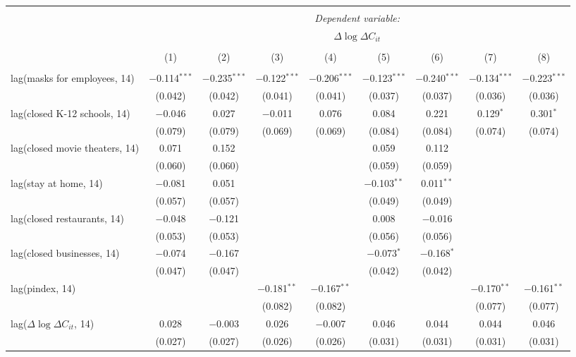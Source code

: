 \begin{tabular}{@{\extracolsep{1pt}}lcccccccc} 
\\[-1.8ex]\hline 
\hline \\[-1.8ex] 
 & \multicolumn{8}{c}{\textit{Dependent variable:}} \\ 
\cline{2-9} 
 & \multicolumn{8}{c}{$\Delta \log \Delta C_{it}$} \\ 
\\[-1.8ex] & (1) & (2) & (3) & (4) & (5) & (6) & (7) & (8)\\ 
\hline \\[-1.8ex] 
 lag(masks for employees, 14) & $-$0.114$^{***}$ & $-$0.235$^{***}$ & $-$0.122$^{***}$ & $-$0.206$^{***}$ & $-$0.123$^{***}$ & $-$0.240$^{***}$ & $-$0.134$^{***}$ & $-$0.223$^{***}$ \\ 
  & (0.042) & (0.042) & (0.041) & (0.041) & (0.037) & (0.037) & (0.036) & (0.036) \\ 
  lag(closed K-12 schools, 14) & $-$0.046 & 0.027 & $-$0.011 & 0.076 & 0.084 & 0.221 & 0.129$^{*}$ & 0.301$^{*}$ \\ 
  & (0.079) & (0.079) & (0.069) & (0.069) & (0.084) & (0.084) & (0.074) & (0.074) \\ 
  lag(closed movie theaters, 14) & 0.071 & 0.152 &  &  & 0.059 & 0.112 &  &  \\ 
  & (0.060) & (0.060) &  &  & (0.059) & (0.059) &  &  \\ 
  lag(stay at home, 14) & $-$0.081 & 0.051 &  &  & $-$0.103$^{**}$ & 0.011$^{**}$ &  &  \\ 
  & (0.057) & (0.057) &  &  & (0.049) & (0.049) &  &  \\ 
  lag(closed restaurants, 14) & $-$0.048 & $-$0.121 &  &  & 0.008 & $-$0.016 &  &  \\ 
  & (0.053) & (0.053) &  &  & (0.056) & (0.056) &  &  \\ 
  lag(closed businesses, 14) & $-$0.074 & $-$0.167 &  &  & $-$0.073$^{*}$ & $-$0.168$^{*}$ &  &  \\ 
  & (0.047) & (0.047) &  &  & (0.042) & (0.042) &  &  \\ 
  lag(pindex, 14) &  &  & $-$0.181$^{**}$ & $-$0.167$^{**}$ &  &  & $-$0.170$^{**}$ & $-$0.161$^{**}$ \\ 
  &  &  & (0.082) & (0.082) &  &  & (0.077) & (0.077) \\ 
  lag($\Delta \log \Delta C_{it}$, 14) & 0.028 & $-$0.003 & 0.026 & $-$0.007 & 0.046 & 0.044 & 0.044 & 0.046 \\ 
  & (0.027) & (0.027) & (0.026) & (0.026) & (0.031) & (0.031) & (0.031) & (0.031) \\ 

\end{tabular}
